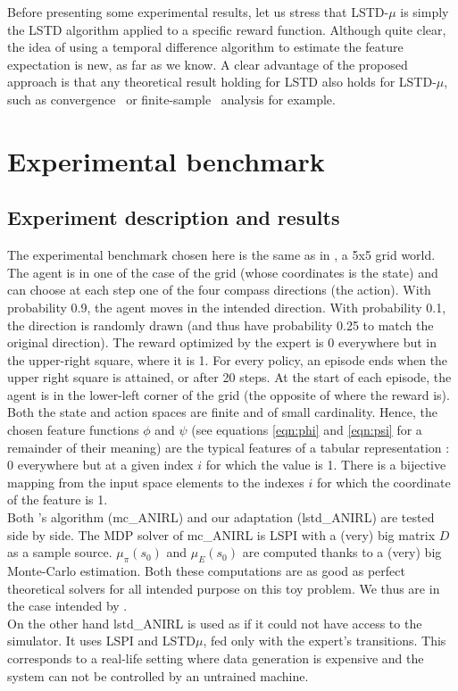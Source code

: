 \documentclass{jfpda2011}
\begin{document}
Before presenting some experimental results, let us stress that
LSTD-$\mu$ is simply the LSTD algorithm applied to a specific reward
function. Although quite clear, the idea of using a temporal
difference algorithm to estimate the feature expectation is new, as
far as we know. A clear advantage of the proposed approach is that
any theoretical result holding for LSTD also holds for LSTD-$\mu$,
such as convergence~\citep{nedic2003least} or
finite-sample~\citep{lazaric2010finiteLSTD} analysis for example.

\section{Experimental benchmark}
\label{sec:exp}
\subsection{Experiment description and results}
The experimental benchmark chosen here is the same as in \citep{ng2000algorithms}, a 5x5 grid world. The agent is in one of the case of the grid (whose coordinates is the state) and can choose at each step one of the four compass directions (the action). With probability 0.9, the agent moves in the intended direction. With probability 0.1, the direction is randomly drawn (and thus have probability 0.25 to match the original direction). The reward optimized by the expert is 0 everywhere but in the upper-right square, where it is 1. For every policy, an episode ends when the upper right square is attained, or after 20 steps. At the start of each episode, the agent is in the lower-left corner of the grid (the opposite of where the reward is).\\

Both the state and action spaces are finite and of small cardinality. Hence, the chosen feature functions $\phi$ and $\psi$ (see equations \ref{eqn:phi} and \ref{eqn:psi} for a remainder of their meaning) are the typical features of a tabular representation : 0 everywhere but at a given index $i$ for which the value is 1. There is a bijective mapping from the input space elements to the indexes $i$ for which the coordinate of the feature is 1.\\

Both \citet{abbeel2004apprenticeship}'s algorithm (mc\_ANIRL) and our adaptation (lstd\_ANIRL) are tested side by side. The MDP solver of mc\_ANIRL is LSPI with a (very) big matrix $D$ as a sample source. $\mu_\pi(s_0)$ and $\mu_E(s_0)$ are computed thanks to a (very) big Monte-Carlo estimation. Both these computations are  as good as perfect theoretical solvers for all intended purpose on this toy problem. We thus are in the case intended by \citet{abbeel2004apprenticeship}.\\
On the other hand lstd\_ANIRL is used as if it could not have access to the simulator. It uses LSPI and LSTD$\mu$, fed only with the expert's transitions. This corresponds to a real-life setting where data generation is expensive and the system can not be controlled by an untrained machine.\\
\end{document}
